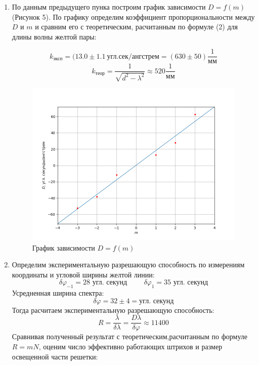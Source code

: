 \documentclass{article}
\begin{document}
\begin{enumerate}
\begin{table}[h!]
\caption{Угловая дисперсия в спектрах разного порядка, определенная по линиям желтого дуплета}
\label{tab:my-table}
\end{table}

\item По данным предыдущего пунка построим график зависимости $D = f(m)$ (Рисунок 5).  По графику определим коэффициент пропорциональности между $D$ и $m$ и сравним его с теоретическим, расчитанным по формуле (2) для длины волны желтой пары:


\[k_\text{эксп} = (13.0 \pm 1.1~\text{угл.сек/ангстрем} = (630 \pm 50) \frac{1}{\text{мм}}\]
\[k_\text{теор} =\frac{1}{\sqrt{d^{2}-\lambda^{2}}} \approx 520 \frac{1}{\text{мм}}\]

\begin{figure}[h!]
	\includegraphics[scale=0.6]{Figure_22.png}
	\centering
	\caption{График зависимости $D = f (m)$}
\end{figure}
\item Определим экспериментальную разрешающую способность по измерениям координаты и угловой ширины желтой линии:
\[
\delta \varphi_{-1} = 28 \text{ угл. секунд} \hspace{1cm}
\delta \varphi_{1} = 35 \text{ угл. секунд}
\]
Усредненная ширина спектра:
\[
\delta \varphi = 32 \pm 4 =  \text{угл. секунд}\]
Тогда расчитаем экспериментальную разрешающую способность:
\[R = \dfrac{\lambda}{\delta \lambda} = \dfrac{D\lambda}{\delta \varphi} \approx 11400\]
Сравнивая полученный результат с теоретическим,расчитанным по формуле $R = mN$, оценим число эффективно работающих штрихов и размер освещенной части решетки:


\end{enumerate}
\end{document}
